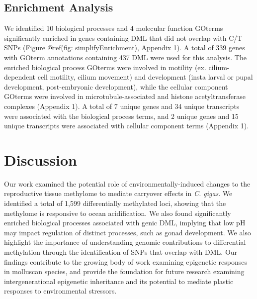 \documentclass [11pt, proquest] {uwthesis}[2015/03/03]
\begin{document}
\hypertarget{enrichment-analysis-1}{%
\subsection{Enrichment Analysis}\label{enrichment-analysis-1}}

We identified 10 biological processes and 4 molecular function GOterms significantly enriched in genes containing DML that did not overlap with C/T SNPs (Figure @ref(fig: simplifyEnrichment), Appendix 1). A total of 339 genes with GOterm annotations containing 437 DML were used for this analysis. The enriched biological process GOterms were involved in motility (ex. cilium-dependent cell motility, cilium movement) and development (insta larval or pupal development, post-embryonic development), while the cellular component GOterms were involved in microtubule-associated and histone acetyltransferase complexes (Appendix 1). A total of 7 unique genes and 34 unique transcripts were associated with the biological process terms, and 2 unique genes and 15 unique transcripts were associated with cellular component terms (Appendix 1).

\hypertarget{discussion-2}{%
\section{Discussion}\label{discussion-2}}

Our work examined the potential role of environmentally-induced changes to the reproductive tissue methylome to mediate carryover effects in \emph{C. gigas}. We identified a total of 1,599 differentially methylated loci, showing that the methylome is responsive to ocean acidification. We also found significantly enriched biological processes associated with genic DML, implying that low pH may impact regulation of distinct processes, such as gonad development. We also highlight the importance of understanding genomic contributions to differential methylation through the identification of SNPs that overlap with DML. Our findings contribute to the growing body of work examining epigenetic responses in molluscan species, and provide the foundation for future research examining intergenerational epigenetic inheritance and its potential to mediate plastic responses to environmental stressors.
\end{document}
